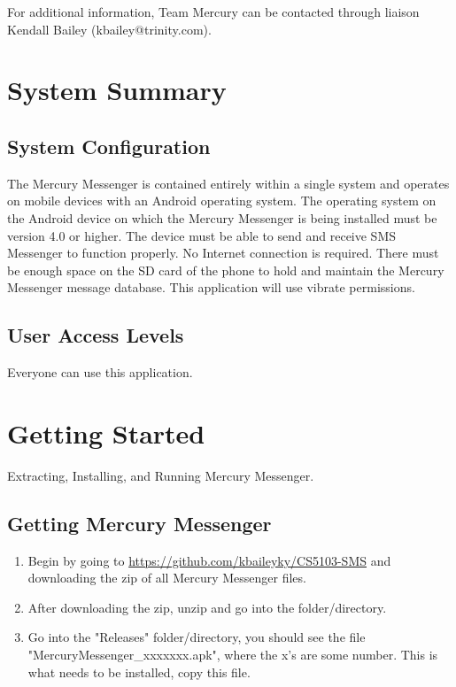 \documentclass{article}
\begin{document}
For additional information, Team Mercury can be contacted through liaison Kendall Bailey (kbailey@trinity.com).

\section{System Summary}
\label{sec:SysSummary}

\subsection{System Configuration}
The Mercury Messenger is contained entirely within a single system and operates on mobile devices with an Android operating system. The operating system on the Android device on which the Mercury Messenger is being installed must be version 4.0 or higher. The device must be able to send and receive SMS Messenger to function properly. No Internet connection is required. There must be enough space on the SD card of the phone to hold and maintain the Mercury Messenger message database. This application will use vibrate permissions.

\subsection{User Access Levels}
Everyone can use this application.

\section{Getting Started}
Extracting, Installing, and Running Mercury Messenger.

\subsection{Getting Mercury Messenger}
\begin{enumerate}
\item Begin by going to \url{https://github.com/kbaileyky/CS5103-SMS} and downloading the zip of all Mercury Messenger files.
\item After downloading the zip, unzip and go into the folder/directory.
\item Go into the "Releases" folder/directory, you should see the file "MercuryMessenger\_xxxxxxx.apk", where the x's are some number. This is what needs to be installed, copy this file.


\end{enumerate}
\end{document}
